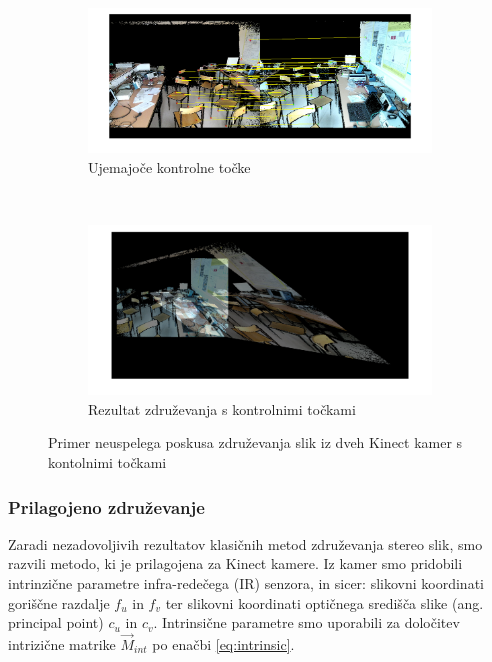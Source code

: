 \begin{figure}[htb]
\centering
\begin{subfigure}[t]{0.45\columnwidth}
\includegraphics[width=\columnwidth]{./Slike/matched-points.png}
\caption{Ujemajoče kontrolne točke}
\label{fig:zdruzevanje-ujemajoce-cp}
\end{subfigure}
~
\begin{subfigure}[t]{0.45\columnwidth}
\includegraphics[width=\columnwidth]{./Slike/points-calibration-result.png}
\caption{Rezultat združevanja s kontrolnimi točkami}
\label{fig:zdruzevanje-result-cp}
\end{subfigure}
\caption{Primer neuspelega poskusa združevanja slik iz dveh Kinect kamer s kontolnimi točkami}
\label{fig:zdruzevanje-cp}
\end{figure}


\subsubsection{Prilagojeno združevanje}
Zaradi nezadovoljivih rezultatov klasičnih metod združevanja stereo slik, smo razvili metodo, ki je prilagojena za Kinect kamere. Iz kamer smo pridobili intrinzične parametre infra-redečega (IR) senzora, in sicer: slikovni koordinati goriščne razdalje $f_u$ in $f_v$ ter slikovni koordinati optičnega središča slike (ang. principal point) $c_u$ in $c_v$. Intrinsične parametre smo uporabili za določitev intrizične matrike $\vec{M}_{int}$ po enačbi \eqref{eq:intrinsic}.


